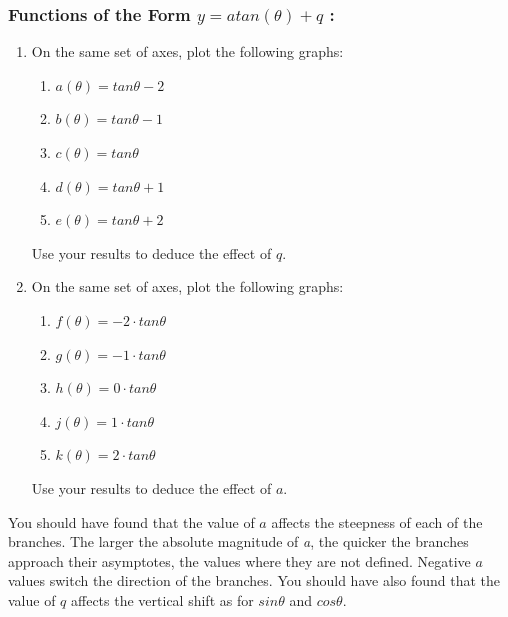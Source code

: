             \subsubsection{  Functions of the Form $y=atan\left(\theta \right)+q$ :}
            \nopagebreak
        \label{m39414*id90310}\begin{enumerate}[noitemsep, label=\textbf{\arabic*}. ] 
            \label{m39414*uid74}\item On the same set of axes, plot the following graphs:
\label{m39414*id90326}\begin{enumerate}[noitemsep, label=\textbf{\alph*}. ] 
            \label{m39414*uid75}\item $a\left(\theta \right)=tan\theta -2$\label{m39414*uid76}\item $b\left(\theta \right)=tan\theta -1$\label{m39414*uid77}\item $c\left(\theta \right)=tan\theta $\label{m39414*uid78}\item $d\left(\theta \right)=tan\theta +1$\label{m39414*uid79}\item $e\left(\theta \right)=tan\theta +2$\end{enumerate}
Use your results to deduce the effect of $q$.
\label{m39414*uid80}\item On the same set of axes, plot the following graphs:
\label{m39414*id90547}\begin{enumerate}[noitemsep, label=\textbf{\alph*}. ] 
            \label{m39414*uid81}\item $f\left(\theta \right)=-2\ensuremath{\cdot}tan\theta $\label{m39414*uid82}\item $g\left(\theta \right)=-1\ensuremath{\cdot}tan\theta $\label{m39414*uid83}\item $h\left(\theta \right)=0\ensuremath{\cdot}tan\theta $\label{m39414*uid84}\item $j\left(\theta \right)=1\ensuremath{\cdot}tan\theta $\label{m39414*uid85}\item $k\left(\theta \right)=2\ensuremath{\cdot}tan\theta $\end{enumerate}
Use your results to deduce the effect of $a$.
\end{enumerate}
        \label{m39414*id90781}You should have found that the value of $a$ affects the steepness of each of the branches. The larger the absolute magnitude of \textsl{a}, the quicker the branches approach their asymptotes, the values where they are not defined. Negative $\mathit{a}$ values switch the direction of the branches.
You should have also found that the value of $q$ affects the vertical shift as for $sin\theta $ and $cos\theta $.
